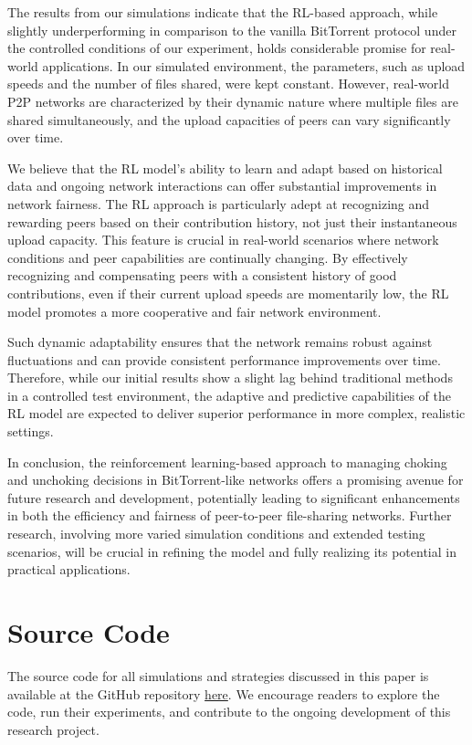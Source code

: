 \documentclass{article}
\begin{document}
The results from our simulations indicate that the RL-based approach, while slightly underperforming in comparison to the vanilla BitTorrent protocol under the controlled conditions of our experiment, holds considerable promise for real-world applications. In our simulated environment, the parameters, such as upload speeds and the number of files shared, were kept constant. However, real-world P2P networks are characterized by their dynamic nature where multiple files are shared simultaneously, and the upload capacities of peers can vary significantly over time.

We believe that the RL model's ability to learn and adapt based on historical data and ongoing network interactions can offer substantial improvements in network fairness. The RL approach is particularly adept at recognizing and rewarding peers based on their contribution history, not just their instantaneous upload capacity. This feature is crucial in real-world scenarios where network conditions and peer capabilities are continually changing. By effectively recognizing and compensating peers with a consistent history of good contributions, even if their current upload speeds are momentarily low, the RL model promotes a more cooperative and fair network environment.

Such dynamic adaptability ensures that the network remains robust against fluctuations and can provide consistent performance improvements over time. Therefore, while our initial results show a slight lag behind traditional methods in a controlled test environment, the adaptive and predictive capabilities of the RL model are expected to deliver superior performance in more complex, realistic settings.

In conclusion, the reinforcement learning-based approach to managing choking and unchoking decisions in BitTorrent-like networks offers a promising avenue for future research and development, potentially leading to significant enhancements in both the efficiency and fairness of peer-to-peer file-sharing networks. Further research, involving more varied simulation conditions and extended testing scenarios, will be crucial in refining the model and fully realizing its potential in practical applications.

\section{Source Code}
The source code for all simulations and strategies discussed in this paper is available at the GitHub repository \href{https://github.com/shlok-007/CN-Lab-Project}{here}. We encourage readers to explore the code, run their experiments, and contribute to the ongoing development of this research project.
\end{document}
